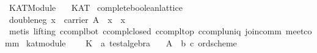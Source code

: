 %
\begin{isabellebody}%
\def\isabellecontext{KAT{\isaliteral{5F}{\isacharunderscore}}Module}%
%
\isadelimtheory
%
\endisadelimtheory
%
\isatagtheory
{}\isamarkupfalse%
\ KAT{}Module\isanewline
\ \ \ KAT\isanewline
{}%
\endisatagtheory
{\isafoldtheory}%
%
\isadelimtheory
\isanewline
%
\endisadelimtheory
\isanewline
{}\isamarkupfalse%
\ complete{}boolean{}lattice\isanewline
{}\isanewline
\isanewline
\ \ \isamarkupfalse%
\ double{}neg{}\ {}x\ {}\ carrier\ A\ {}\ {}{}{}x{}\ {}\ x{}\isanewline
%
\isadelimproof
\ \ \ \ %
\endisadelimproof
%
\isatagproof
{}\isamarkupfalse%
\ {}metis\ {}lifting{}\ ccompl{}bot\ ccompl{}closed\ ccompl{}top\ ccompl{}uniq\ join{}comm\ meet{}comm{}%
\endisatagproof
{\isafoldproof}%
%
\isadelimproof
\isanewline
%
\endisadelimproof
\isanewline
{}\isamarkupfalse%
\isanewline
\isanewline
{}\isamarkupfalse%
\ kat{}module{}\ {}\isanewline
\ \ \ K\ {}{}\ {}{}a\ test{}algebra{}\isanewline
\ \ \ A\ {}{}\ {}{}{}b{}\ {}c{}\ ord{}scheme{}\isanewline

\end{isabellebody}
